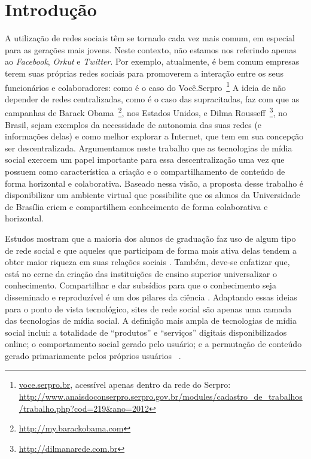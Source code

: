 \chapter{Introdução}
 
A utilização de redes sociais têm se tornado cada vez mais comum, em especial
para as gerações mais jovens. Neste contexto, não estamos nos
referindo apenas ao \textit{Facebook}, \textit{Orkut} e \textit{Twitter}. 
%
Por exemplo, atualmente, é bem comum empresas terem suas próprias redes sociais para
promoverem a interação entre os seus funcionários e colaboradores: como é o caso do
Você.Serpro~\footnote{\url{voce.serpro.br}, acessível apenas dentro da rede do Serpro:
\url{http://www.anaisdoconserpro.serpro.gov.br/modules/cadastro_de_trabalhos/trabalho.php?cod=219&ano=2012}}
%
A ideia de não depender de redes centralizadas, como é o caso das supracitadas, faz com que
as campanhas de Barack Obama~\footnote{\url{http://my.barackobama.com}}, nos
Estados Unidos, e Dilma Rousseff~\footnote{\url{http://dilmanarede.com.br}}, no
Brasil, sejam exemplos da necessidade de autonomia das suas redes
(e informações delas) e como melhor explorar a Internet, que tem em sua
concepção ser descentralizada. 
%
Argumentamos neste trabalho que as tecnologias de mídia social exercem um papel importante para 
essa descentralização uma vez que possuem como característica a criação e o
compartilhamento de conteúdo de forma horizontal e colaborativa. 
%
Baseado nessa visão, a proposta desse trabalho é disponibilizar um ambiente
virtual que possibilite que os alunos da Universidade de Brasília criem e
compartilhem conhecimento de forma colaborativa e horizontal.
 
Estudos mostram que a maioria dos alunos de graduação faz uso de algum
tipo de rede social e que aqueles que participam de forma mais ativa delas
tendem a obter maior riqueza em suas relações sociais .
%
Também, deve-se enfatizar que, está no cerne da criação das instituições de
ensino superior universalizar o conhecimento. Compartilhar e dar subsídios para
que o conhecimento seja disseminado e reproduzível é um dos pilares da ciência
\cite{kon2011}.
%
Adaptando essas ideias para o ponto de vista tecnológico, sites de rede social
são apenas uma camada das tecnologias de mídia social. A definição mais ampla de
tecnologias de mídia social inclui: a totalidade de ``produtos'' e ``serviços''
digitais disponibilizados online; o comportamento social gerado pelo usuário; e
a permutação de conteúdo gerado primariamente pelos próprios usuários%
~\cite{davis2012}.
 
